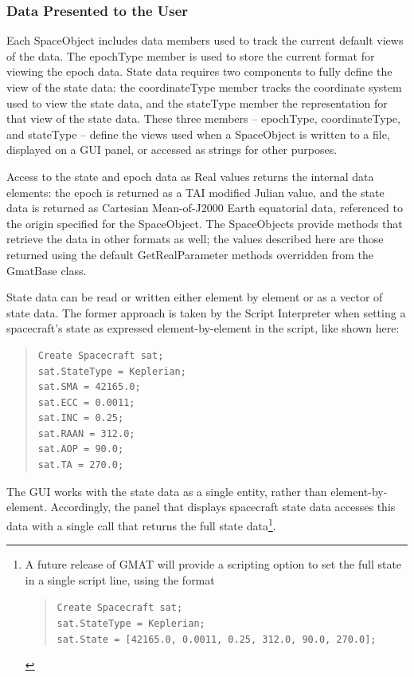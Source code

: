 \subsubsection{Data Presented to the User}

Each SpaceObject includes data members used to track the current default views of the data.  The
epochType member is used to store the current format for viewing the epoch data.  State data
requires two components to fully define the view of the state data: the coordinateType member tracks
the coordinate system used to view the state data, and the stateType member the representation for
that view of the state data.  These three members -- epochType, coordinateType, and stateType --
define the views used when a SpaceObject is written to a file, displayed on a GUI panel, or accessed
as strings for other purposes.

Access to the state and epoch data as Real values returns the internal data elements: the epoch
is returned as a TAI modified Julian value, and the state data is returned as Cartesian
Mean-of-J2000 Earth equatorial data, referenced to the origin specified for the SpaceObject.  The
SpaceObjects provide methods that retrieve the data in other formats as well; the values described
here are those returned using the default GetRealParameter methods overridden from the GmatBase
class.

State data can be read or written either element by element or as a vector of state data.  The
former approach is taken by the Script Interpreter when setting a spacecraft's state as expressed
element-by-element in the script, like shown here:

\begin{quote}
\begin{verbatim}
Create Spacecraft sat;
sat.StateType = Keplerian;
sat.SMA = 42165.0;
sat.ECC = 0.0011;
sat.INC = 0.25;
sat.RAAN = 312.0;
sat.AOP = 90.0;
sat.TA = 270.0;
\end{verbatim}
\end{quote}

\noindent The GUI works with the state data as a single entity, rather than element-by-element.
Accordingly, the panel that displays spacecraft state data accesses this data with a single call
that returns the full state data\footnote{A future release of GMAT will provide a scripting option
to set the full state in a single script line, using the format

\begin{quote}
\texttt{Create Spacecraft sat;\\
sat.StateType = Keplerian;\\
sat.State = [42165.0, 0.0011, 0.25, 312.0, 90.0, 270.0];}
\end{quote}}.

